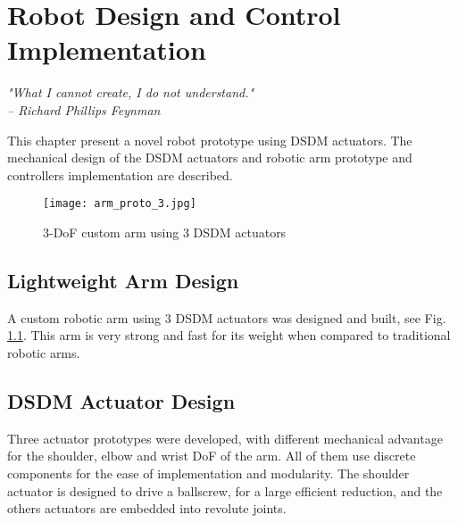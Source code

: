 \chapter{Robot Design and Control Implementation}
\label{sec:ExperimentalValidation}

{
\begin{flushright}
\textit{"What I cannot create, I do not understand."} \\ 
\emph{-- Richard Phillips Feynman}
\end{flushright}
}
\vspace{10pt}



This chapter present a novel robot prototype using DSDM actuators. The mechanical design of the DSDM actuators and robotic arm prototype and controllers implementation are described.

\begin{figure}[htp]
	\centering
		\texttt{[image: arm\_proto\_3.jpg]}
	\caption{3-DoF custom arm using 3 DSDM actuators}
	\label{fig:dsdm_arm}
\end{figure}


\section{Lightweight Arm Design}
\label{sec:DSDMArm}

A custom robotic arm using 3 DSDM actuators was designed and built, see Fig. \ref{fig:dsdm_arm}. This arm is very strong and fast for its weight when compared to traditional robotic arms. 

\section{DSDM Actuator Design}
\label{sec:ActuatorDesign}

Three actuator prototypes were developed, with different mechanical advantage for the shoulder, elbow and wrist DoF of the arm. All of them use discrete components for the ease of implementation and modularity. The shoulder actuator is designed to drive a ballscrew, for a large efficient reduction, and the others actuators are embedded into revolute joints. 

